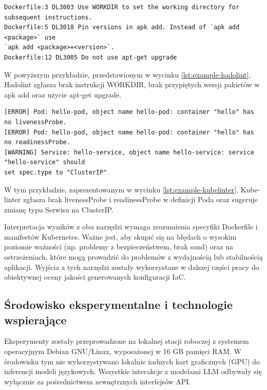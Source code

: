 \begin{lstlisting}[caption={Przykład wyników Hadolint},label={lst:example-hadolint},captionpos=b,columns=fullflexible, breaklines=true]
Dockerfile:3 DL3003 Use WORKDIR to set the working directory for subsequent instructions.
Dockerfile:5 DL3018 Pin versions in apk add. Instead of `apk add <package>` use
`apk add <package>=<version>`.
Dockerfile:12 DL3005 Do not use apt-get upgrade
\end{lstlisting}

W powyższym przykładzie, przedstawionym w wycinku \ref{lst:example-hadolint}, Hadolint zgłasza brak instrukcji WORKDIR, brak przypiętych wersji pakietów w apk add oraz użycie apt-get upgrade.

\begin{lstlisting}[caption={Przykład wyników Kube-linter},label={lst:example-kubelinter},captionpos=b,columns=fullflexible, breaklines=true]
[ERROR] Pod: hello-pod, object name hello-pod: container "hello" has no livenessProbe.
[ERROR] Pod: hello-pod, object name hello-pod: container "hello" has no readinessProbe.
[WARNING] Service: hello-service, object name hello-service: service "hello-service" should
set spec.type to "ClusterIP"
\end{lstlisting}

W tym przykładzie, zaprezentowanym w wycinku \ref{lst:example-kubelinter}, Kube-linter zgłasza brak livenessProbe i readinessProbe w definicji Poda oraz sugeruje zmianę typu Serwisu na ClusterIP.

Interpretacja wyników z obu narzędzi wymaga zrozumienia specyfiki Dockerfile i manifestów Kubernetes. Ważne jest, aby skupić się na błędach o wysokim poziomie ważności (np. problemy z bezpieczeństwem, brak sond) oraz na ostrzeżeniach, które mogą prowadzić do problemów z wydajnością lub stabilnością aplikacji. Wyjścia z tych narzędzi zostały wykorzystane w dalszej części pracy do obiektywnej oceny jakości generowanych konfiguracji IaC.

\subsection{Środowisko eksperymentalne i technologie wspierające}

Eksperymenty zostały przeprowadzone na lokalnej stacji roboczej z systemem operacyjnym Debian GNU/Linux, wyposażonej w 16 GB pamięci RAM. W środowisku tym nie wykorzystywano lokalnie żadnych kart graficznych (GPU) do inferencji modeli językowych. Wszystkie interakcje z modelami LLM odbywały się wyłącznie za pośrednictwem zewnętrznych interfejsów API.

